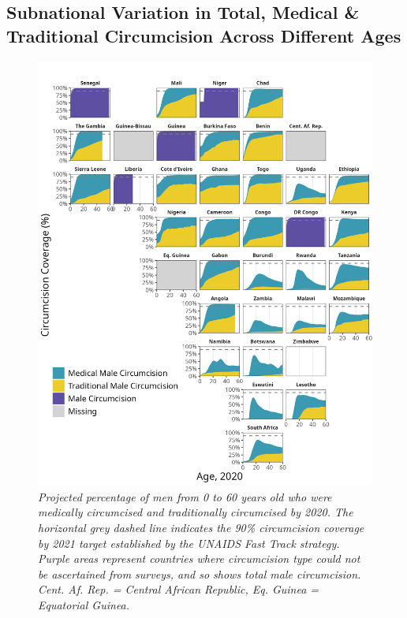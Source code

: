\documentclass{article}
\begin{document}




\subsection{Subnational Variation in Total, Medical \& Traditional Circumcision Across Different Ages}
\label{sec:org92e0f37}

\begin{figure}[H]
    \centering
    \includegraphics[width=.9\linewidth]
    {plots/04_geo_age.png}
    \caption{\emph{Projected percentage of men from 0 to 60 years old who were medically circumcised and traditionally circumcised by 2020. The horizontal grey dashed line indicates the 90\% circumcision coverage by 2021 target established by the UNAIDS Fast Track strategy. Purple areas represent countries where circumcision type could not be ascertained from surveys, and so shows total male circumcision. Cent. Af. Rep. = Central African Republic, Eq. Guinea = Equatorial Guinea.}}
\end{figure}
\end{document}
